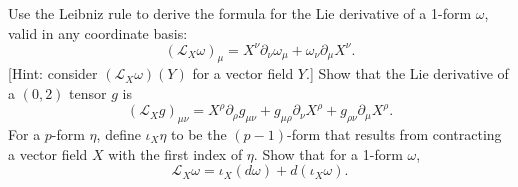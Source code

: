 Use the Leibniz rule to derive the formula for the Lie derivative of a 1-form $\omega$, valid in any coordinate basis:
\begin{equation}
    (\mathcal{L}_X\omega)_\mu = X^\nu\partial_\nu\omega_\mu + \omega_\nu\partial_\mu X^\nu.
\end{equation}
[Hint: consider $(\mathcal{L}_X\omega)(Y)$ for a vector field $Y$.] Show that the Lie derivative of a $(0,2)$ tensor $g$ is
\begin{equation}
    (\mathcal{L}_X g)_{\mu\nu} = X^\rho\partial_\rho g_{\mu\nu} + g_{\mu\rho}\partial_\nu X^\rho + g_{\rho\nu}\partial_\mu X^\rho.
\end{equation}
For a $p$-form $\eta$, define $\iota_X\eta$ to be the $(p-1)$-form that results from contracting a vector field $X$ with the first index of $\eta$. Show that for a 1-form $\omega$,
\begin{equation}
    \mathcal{L}_X\omega = \iota_X(d\omega) + d(\iota_X\omega).
\end{equation}
